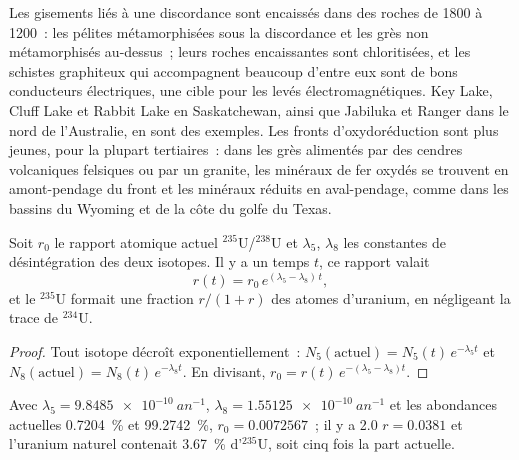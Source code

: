 Les gisements liés à une discordance sont encaissés dans des roches de 1800 à \qty{1200}{\Ma}~: les pélites métamorphisées sous la discordance
et les grès non métamorphisés au-dessus~; leurs roches encaissantes sont chloritisées, et les schistes graphiteux qui accompagnent beaucoup d'entre eux
sont de bons conducteurs électriques, une cible pour les levés électromagnétiques. Key
Lake, Cluff Lake et Rabbit Lake en Saskatchewan, ainsi que Jabiluka et Ranger dans le nord de l'Australie, en sont des exemples.
Les fronts d'oxydoréduction sont plus jeunes, pour la plupart tertiaires~: dans les grès alimentés par des cendres volcaniques felsiques
ou par un granite, les minéraux de fer oxydés se trouvent en amont-pendage du front et les minéraux réduits en aval-pendage,
comme dans les bassins du Wyoming et de la côte du golfe du Texas.

\begin{proposition}\label{prop:b2:energy-geology:u235}
Soit $r_0$ le rapport atomique actuel $^{235}$U/$^{238}$U et $\lambda_5$, $\lambda_8$ les constantes de désintégration des deux isotopes.
Il y a un temps $t$, ce rapport valait
\begin{equation}
r(t) = r_0\,e^{(\lambda_5 - \lambda_8)\,t} ,
\label{eq:b2:energy-geology:u235}
\end{equation}
et le $^{235}$U formait une fraction $r/(1 + r)$ des atomes d'uranium, en négligeant la trace
de $^{234}$U.
\end{proposition}

\begin{proof}
Tout isotope décroît exponentiellement~: $N_5(\text{actuel}) = N_5(t)\,e^{-\lambda_5 t}$ et $N_8(\text{actuel})
= N_8(t)\,e^{-\lambda_8 t}$. En divisant, $r_0 = r(t)\,e^{-(\lambda_5 - \lambda_8)t}$.
\end{proof}

Avec $\lambda_5 = \qty{9.8485e-10}{an^{-1}}$, $\lambda_8 = \qty{1.55125e-10}{an^{-1}}$ et les abondances actuelles \qty{0.7204}{\percent}
et \qty{99.2742}{\percent}, $r_0 = 0.0072567$~; il y a \qty{2.0}{\Ga}
$r = 0.0381$ et l'uranium naturel contenait \qty{3.67}{\percent} d'$^{235}$U, soit
cinq fois la part actuelle.

